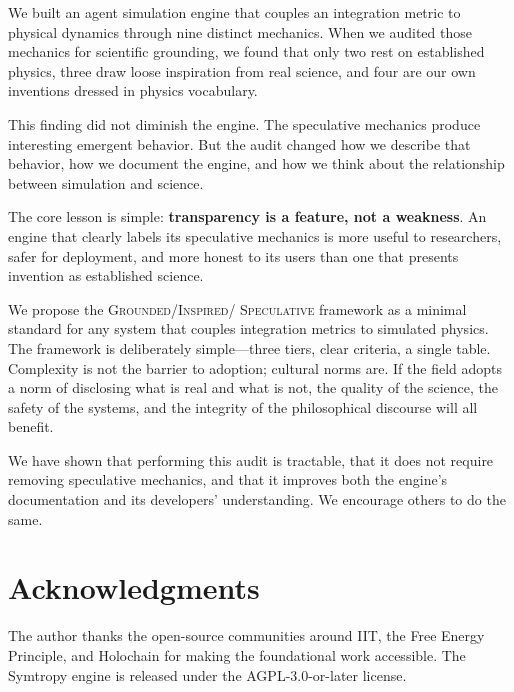 \documentclass[12pt,a4paper]{article}
\begin{document}
We built an agent simulation engine that couples an integration
metric to physical dynamics through nine distinct mechanics.
When we audited those mechanics for scientific grounding, we
found that only two rest on established physics, three draw
loose inspiration from real science, and four are our own
inventions dressed in physics vocabulary.

This finding did not diminish the engine.  The speculative
mechanics produce interesting emergent behavior.  But the audit
changed how we describe that behavior, how we document the
engine, and how we think about the relationship between
simulation and science.

The core lesson is simple: \textbf{transparency is a feature,
not a weakness}.  An engine that clearly labels its speculative
mechanics is more useful to researchers, safer for deployment,
and more honest to its users than one that presents invention
as established science.

We propose the \textsc{Grounded}/\textsc{Inspired}/\textsc{%
Speculative} framework as a minimal standard for any system
that couples integration metrics to simulated physics.  The
framework is deliberately simple---three tiers, clear criteria,
a single table.  Complexity is not the barrier to adoption;
cultural norms are.  If the field adopts a norm of disclosing
what is real and what is not, the quality of the science, the
safety of the systems, and the integrity of the philosophical
discourse will all benefit.

We have shown that performing this audit is tractable, that it
does not require removing speculative mechanics, and that it
improves both the engine's documentation and its developers'
understanding.  We encourage others to do the same.


\section*{Acknowledgments}

The author thanks the open-source communities around IIT, the
Free Energy Principle, and Holochain for making the foundational
work accessible.  The Symtropy engine is released under the
AGPL-3.0-or-later license.
\end{document}
